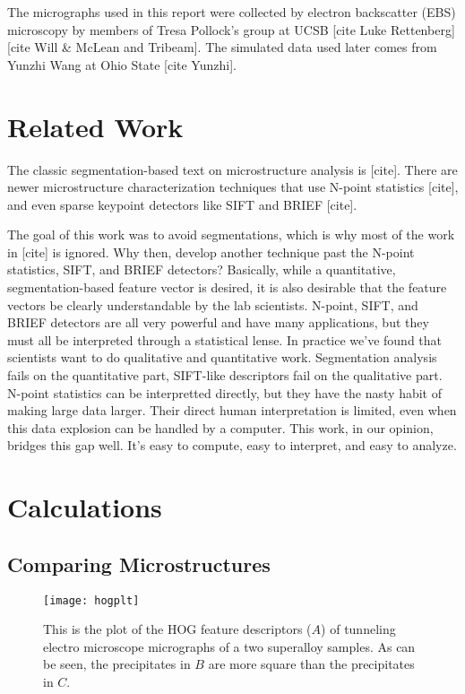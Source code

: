 \documentclass[review]{elsarticle}
\begin{document}
	The micrographs used in this report were collected by electron backscatter (EBS) microscopy by members of Tresa Pollock's group at UCSB [cite Luke Rettenberg] [cite Will \& McLean and Tribeam]. The simulated data used later comes from Yunzhi Wang at Ohio State [cite Yunzhi].
	
	\section{Related Work}
	The classic segmentation-based text on microstructure analysis is [cite]. There are newer microstructure characterization techniques that use N-point statistics [cite], and even sparse keypoint detectors like SIFT and BRIEF [cite].
	
	The goal of this work was to avoid segmentations, which is why most of the work in [cite] is ignored. Why then, develop another technique past the N-point statistics, SIFT, and BRIEF detectors? Basically, while a quantitative, segmentation-based feature vector is desired, it is also desirable that the feature vectors be clearly understandable by the lab scientists. N-point, SIFT, and BRIEF detectors are all very powerful and have many applications, but they must all be interpreted through a statistical lense. In practice we've found that scientists want to do qualitative and quantitative work. Segmentation analysis fails on the quantitative part, SIFT-like descriptors fail on the qualitative part. N-point statistics can be interpretted directly, but they have the nasty habit of making large data larger. Their direct human interpretation is limited, even when this data explosion can be handled by a computer. This work, in our opinion, bridges this gap well. It's easy to compute, easy to interpret, and easy to analyze.

	\section{Calculations}
	\subsection{Comparing Microstructures}
	\begin{figure}[!ht]
  		\centering
    	\texttt{[image: hogplt]}
  		\caption{ This is the plot of the HOG feature descriptors ($A$) of tunneling electro microscope micrographs of a two superalloy samples. As can be seen, the precipitates in $B$ are more square than the precipitates in $C$. }
  		\label{figure2}
	\end{figure}
\end{document}
